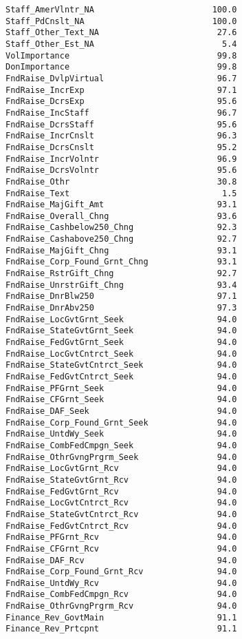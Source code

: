 \documentclass[
  letterpaper,
]{scrbook}
\begin{document}
\begin{verbatim}
Staff_AmerVlntr_NA                        100.0
Staff_PdCnslt_NA                          100.0
Staff_Other_Text_NA                        27.6
Staff_Other_Est_NA                          5.4
VolImportance                              99.8
DonImportance                              99.8
FndRaise_DvlpVirtual                       96.7
FndRaise_IncrExp                           97.1
FndRaise_DcrsExp                           95.6
FndRaise_IncStaff                          96.7
FndRaise_DcrsStaff                         95.6
FndRaise_IncrCnslt                         96.3
FndRaise_DcrsCnslt                         95.2
FndRaise_IncrVolntr                        96.9
FndRaise_DcrsVolntr                        95.6
FndRaise_Othr                              30.8
FndRaise_Text                               1.5
FndRaise_MajGift_Amt                       93.1
FndRaise_Overall_Chng                      93.6
FndRaise_Cashbelow250_Chng                 92.3
FndRaise_Cashabove250_Chng                 92.7
FndRaise_MajGift_Chng                      93.1
FndRaise_Corp_Found_Grnt_Chng              93.1
FndRaise_RstrGift_Chng                     92.7
FndRaise_UnrstrGift_Chng                   93.4
FndRaise_DnrBlw250                         97.1
FndRaise_DnrAbv250                         97.3
FndRaise_LocGvtGrnt_Seek                   94.0
FndRaise_StateGvtGrnt_Seek                 94.0
FndRaise_FedGvtGrnt_Seek                   94.0
FndRaise_LocGvtCntrct_Seek                 94.0
FndRaise_StateGvtCntrct_Seek               94.0
FndRaise_FedGvtCntrct_Seek                 94.0
FndRaise_PFGrnt_Seek                       94.0
FndRaise_CFGrnt_Seek                       94.0
FndRaise_DAF_Seek                          94.0
FndRaise_Corp_Found_Grnt_Seek              94.0
FndRaise_UntdWy_Seek                       94.0
FndRaise_CombFedCmpgn_Seek                 94.0
FndRaise_OthrGvngPrgrm_Seek                94.0
FndRaise_LocGvtGrnt_Rcv                    94.0
FndRaise_StateGvtGrnt_Rcv                  94.0
FndRaise_FedGvtGrnt_Rcv                    94.0
FndRaise_LocGvtCntrct_Rcv                  94.0
FndRaise_StateGvtCntrct_Rcv                94.0
FndRaise_FedGvtCntrct_Rcv                  94.0
FndRaise_PFGrnt_Rcv                        94.0
FndRaise_CFGrnt_Rcv                        94.0
FndRaise_DAF_Rcv                           94.0
FndRaise_Corp_Found_Grnt_Rcv               94.0
FndRaise_UntdWy_Rcv                        94.0
FndRaise_CombFedCmpgn_Rcv                  94.0
FndRaise_OthrGvngPrgrm_Rcv                 94.0
Finance_Rev_GovtMain                       91.1
Finance_Rev_Prtcpnt                        91.1

\end{verbatim}
\end{document}
